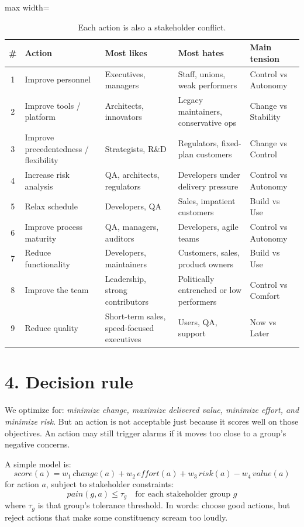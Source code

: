 \documentclass[11pt]{article}
\begin{document}
\begin{table}[h!]
\centering
\scriptsize
\begin{adjustbox}{max width=\textwidth}
\begin{tabular}{c p{} p{} p{} p{}}
\toprule
\# & Action & Most likes & Most hates & Main tension \\
\midrule
1 & Improve personnel & Executives, managers & Staff, unions, weak performers & Control vs Autonomy \\
2 & Improve tools / platform & Architects, innovators & Legacy maintainers, conservative ops & Change vs Stability \\
3 & Improve precedentedness / flexibility & Strategists, R\&D & Regulators, fixed-plan customers & Change vs Control \\
4 & Increase risk analysis & QA, architects, regulators & Developers under delivery pressure & Control vs Autonomy \\
5 & Relax schedule & Developers, QA & Sales, impatient customers & Build vs Use \\
6 & Improve process maturity & QA, managers, auditors & Developers, agile teams & Control vs Autonomy \\
7 & Reduce functionality & Developers, maintainers & Customers, sales, product owners & Build vs Use \\
8 & Improve the team & Leadership, strong contributors & Politically entrenched or low performers & Control vs Comfort \\
9 & Reduce quality & Short-term sales, speed-focused executives & Users, QA, support & Now vs Later \\
\bottomrule
\end{tabular}
\end{adjustbox}
\caption{Each action is also a stakeholder conflict.}
\end{table}

\section*{4. Decision rule}
We optimize for:
\emph{minimize change, maximize delivered value, minimize effort, and minimize risk}.
But an action is not acceptable just because it scores well on those objectives.
An action may still trigger alarms if it moves too close to a group's negative concerns.

A simple model is:
\[
\textit{score}(a)=w_1\,\textit{change}(a)+w_2\,\textit{effort}(a)+w_3\,\textit{risk}(a)-w_4\,\textit{value}(a)
\]
for action $a$, subject to stakeholder constraints:
\[
\textit{pain}(g,a) \le \tau_g \quad \text{for each stakeholder group } g
\]
where $\tau_g$ is that group's tolerance threshold.
In words: choose good actions, but reject actions that make some constituency scream too loudly.
\end{document}
